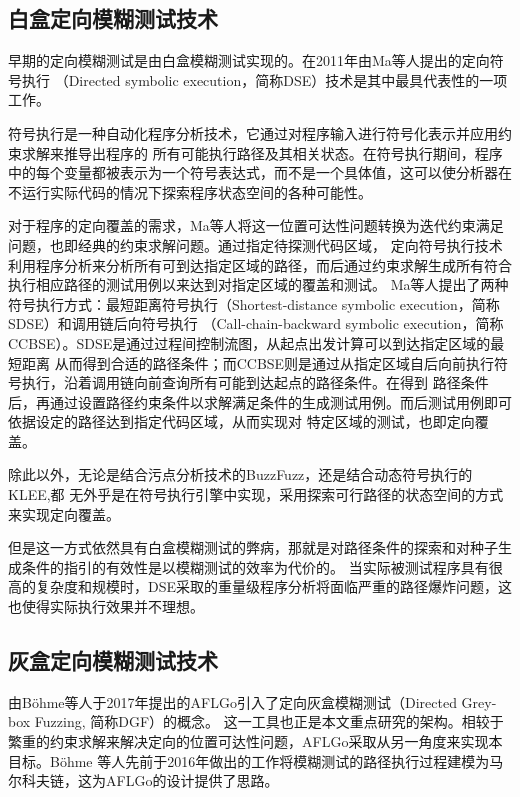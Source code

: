 \documentclass[bachelor]{njupthesis}
\begin{document}
\subsection{白盒定向模糊测试技术}
早期的定向模糊测试是由白盒模糊测试实现的。在2011年由Ma等人提出的定向符号执行\cite{ma2011directed}
（Directed symbolic execution，简称DSE）技术是其中最具代表性的一项工作。

符号执行\cite{king1976select}是一种自动化程序分析技术，它通过对程序输入进行符号化表示并应用约束求解来推导出程序的
所有可能执行路径及其相关状态。在符号执行期间，程序中的每个变量都被表示为一个符号表达式，而不是一个具体值，这可以使分析器在
不运行实际代码的情况下探索程序状态空间的各种可能性。

对于程序的定向覆盖的需求，Ma等人将这一位置可达性问题转换为迭代约束满足问题，也即经典的约束求解问题。通过指定待探测代码区域，
定向符号执行技术利用程序分析来分析所有可到达指定区域的路径，而后通过约束求解生成所有符合执行相应路径的测试用例以来达到对指定区域的覆盖和测试。
Ma等人提出了两种符号执行方式：最短距离符号执行（Shortest-distance symbolic execution，简称SDSE）和调用链后向符号执行
（Call-chain-backward symbolic execution，简称CCBSE）。SDSE是通过过程间控制流图，从起点出发计算可以到达指定区域的最短距离
从而得到合适的路径条件；而CCBSE则是通过从指定区域自后向前执行符号执行，沿着调用链向前查询所有可能到达起点的路径条件。在得到
路径条件后，再通过设置路径约束条件以求解满足条件的生成测试用例。而后测试用例即可依据设定的路径达到指定代码区域，从而实现对
特定区域的测试，也即定向覆盖。

除此以外，无论是结合污点分析技术的BuzzFuzz\cite{ganesh2009taint}，还是结合动态符号执行的KLEE\cite{cadar2008klee},都
无外乎是在符号执行引擎中实现，采用探索可行路径的状态空间的方式来实现定向覆盖。

但是这一方式依然具有白盒模糊测试的弊病，那就是对路径条件的探索和对种子生成条件的指引的有效性是以模糊测试的效率为代价的。
当实际被测试程序具有很高的复杂度和规模时，DSE采取的重量级程序分析将面临严重的路径爆炸问题，这也使得实际执行效果并不理想。

\subsection{灰盒定向模糊测试技术}\label{sec:DGF}
由B{\"o}hme等人于2017年提出的AFLGo\cite{bohmeDGF2017}引入了定向灰盒模糊测试（Directed Grey-box Fuzzing, 简称DGF）的概念。
这一工具也正是本文重点研究的架构。相较于繁重的约束求解来解决定向的位置可达性问题，AFLGo采取从另一角度来实现本目标。B{\"o}hme
等人先前于2016年做出的工作\cite{2016Coverage}将模糊测试的路径执行过程建模为马尔科夫链，这为AFLGo的设计提供了思路。
\end{document}
